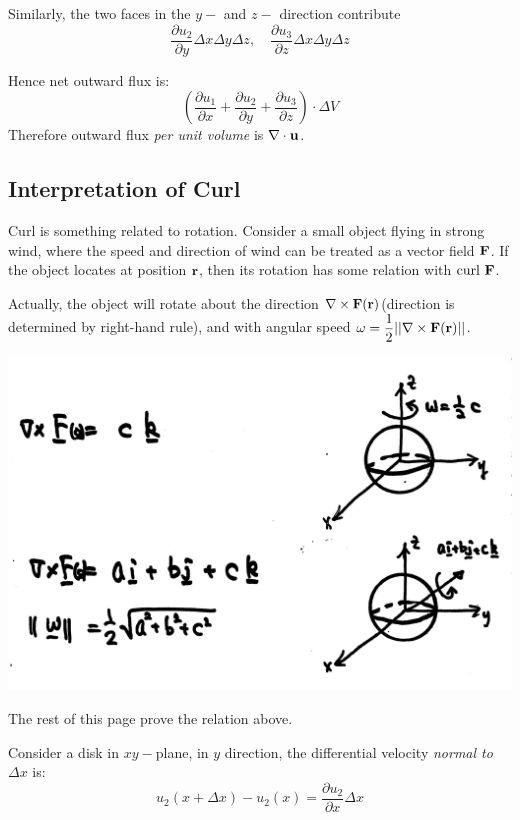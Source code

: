 \documentclass[11pt, a4paper]{MATH2023}
\newcommand{\rr}{{\bf r}}
\newcommand{\FF}{{\bf F}}
\newcommand{\curl}{{\rm curl\ }}
\newcommand{\pt}{\partial}
\begin{document}
\begin{spacing}{1.3}
    Similarly, the two faces in the $y-$ and $z-$ direction contribute 
    $$\frac{\pt u_2}{\pt y} \Delta x \Delta y \Delta z, \quad \frac{\pt u_3}{\pt z} \Delta x \Delta y \Delta z$$

    Hence net outward flux is: 
    $$\left(\frac{\pt u_1}{\pt x} + \frac{\pt u_2}{\pt y} + \frac{\pt u_3}{\pt z}\right)\cdot \Delta V$$
    Therefore outward flux {\it per unit volume} is $\nabla \cdot \uu$.



    \newpage
    \subsection{Interpretation of Curl}

    Curl is something related to rotation. Consider a small object flying in strong wind,
    where the speed and direction of wind can be treated as a vector field $\FF$. If the object 
    locates at position $\rr$, then its rotation has some relation with $\curl \FF$.

    Actually, the object will rotate about the direction $\nabla \times \FF(\rr)$(direction 
    is determined by right-hand rule), and with angular speed $\omega = \dfrac{1}{2} ||\nabla \times \FF(\rr)||$.
    \begin{center}
        \includegraphics[scale=0.13]{images/Ch15-curl-rotation.png}
    \end{center}

    {\blue The rest of this page prove the relation above.}

    Consider a disk in $xy-$plane, in $y$ direction, the differential velocity 
    {\it normal to }$\Delta x$ is: 
    $$u_2(x+\Delta x)-u_2(x)=\dfrac{\pt u_2}{\pt x}\Delta x$$
    \begin{center}
        \begin{tikzpicture}[x=0.75pt,y=0.75pt,yscale=-1,xscale=1]


\end{tikzpicture}
\end{center}
\end{spacing}
\end{document}
